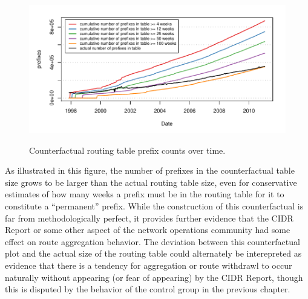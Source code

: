 \begin{figure}[h]
\begin{center}
    \includegraphics[width=6in]{figures/counterfactual.pdf}
    \vspace{-2em}\\
    \caption{Counterfactual routing table prefix counts over time.}
    \label{fig:counterfactual}
\end{center}
\end{figure}

As illustrated in this figure, the number of prefixes in the counterfactual
table size grows to be larger than the actual routing table size, even for
conservative estimates of how many weeks a prefix must be in the routing table
for it to constitute a ``permanent'' prefix. While the construction of this
counterfactual is far from methodologically perfect, it provides further
evidence that the CIDR Report or some other aspect of the network operations
community had some effect on route aggregation behavior. The deviation between
this counterfactual plot and the actual size of the routing table could
alternately be interepreted as evidence that there is a tendency for
aggregation or route withdrawl to occur naturally without appearing (or fear of
appearing) by the CIDR Report, though this is disputed by the behavior of the
control group in the previous chapter.

%
%
%
%

